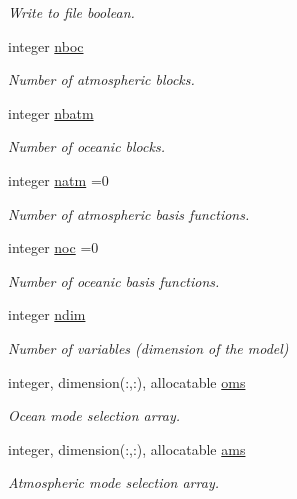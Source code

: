 \begin{DoxyCompactItemize}
\begin{DoxyCompactList}\small\item\em Write to file boolean. \end{DoxyCompactList}\item 
integer \hyperlink{namespaceparams_a54123b5a947703d21d0c882dec6780ac}{nboc}
\begin{DoxyCompactList}\small\item\em Number of atmospheric blocks. \end{DoxyCompactList}\item 
integer \hyperlink{namespaceparams_aa5dc201b0a59d8bb25a5dc52d2ed3cac}{nbatm}
\begin{DoxyCompactList}\small\item\em Number of oceanic blocks. \end{DoxyCompactList}\item 
integer \hyperlink{namespaceparams_a4f46551b6a8ad183d2dced1da3dc5fed}{natm} =0
\begin{DoxyCompactList}\small\item\em Number of atmospheric basis functions. \end{DoxyCompactList}\item 
integer \hyperlink{namespaceparams_acdb6ef89bcada9ba7b6b6bba575b60f4}{noc} =0
\begin{DoxyCompactList}\small\item\em Number of oceanic basis functions. \end{DoxyCompactList}\item 
integer \hyperlink{namespaceparams_a2323fe1773f086e20c14f266351c482b}{ndim}
\begin{DoxyCompactList}\small\item\em Number of variables (dimension of the model) \end{DoxyCompactList}\item 
integer, dimension(\+:,\+:), allocatable \hyperlink{namespaceparams_a5e25e072992d5908eea5308243b7ec63}{oms}
\begin{DoxyCompactList}\small\item\em Ocean mode selection array. \end{DoxyCompactList}\item 
integer, dimension(\+:,\+:), allocatable \hyperlink{namespaceparams_aa95299f1a9c54693b85e049004369089}{ams}
\begin{DoxyCompactList}\small\item\em Atmospheric mode selection array. \end{DoxyCompactList}\end{DoxyCompactItemize}


